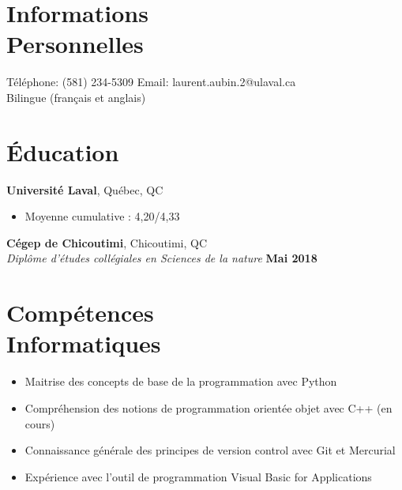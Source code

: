 \documentclass[margin,line]{resume}
\begin{document}
\begin{resume}
    \section{\mysidestyle Informations\\Personnelles}

    T\'{e}l\'{e}phone: (581) 234-5309     \hfill \noindent Email: laurent.aubin.2@ulaval.ca \\
    Bilingue (fran\c{c}ais et anglais)
    

    \section{\mysidestyle \'{E}ducation}

    \textbf{Universit\'{e} Laval}, Qu\'{e}bec, QC \vspace{2mm}\\\vspace{1mm}%
    \begin{itemize}[nosep]
        \item Moyenne cumulative : 4,20/4,33
    \end{itemize}
    
      \textbf{C\'{e}gep de Chicoutimi}, Chicoutimi, QC \vspace{2mm}\\\vspace{1mm}%
    \textsl{Dipl\^{o}me d'\'{e}tudes coll\'{e}giales en Sciences de la nature} \hfill \textbf{Mai 2018} \\
  
    
    \section{\mysidestyle Comp\'{e}tences\\Informatiques}
     \begin{itemize}[nosep]
        \item Maitrise des concepts de base de la programmation avec Python
        \item Compr\'{e}hension des notions de programmation orient\'{e}e objet avec C++ (en cours)
         \item Connaissance g\'{e}n\'{e}rale des principes de version control avec Git et Mercurial
        \item Exp\'{e}rience avec l'outil de programmation Visual Basic for Applications
    \end{itemize}
    

\end{resume}
\end{document}
